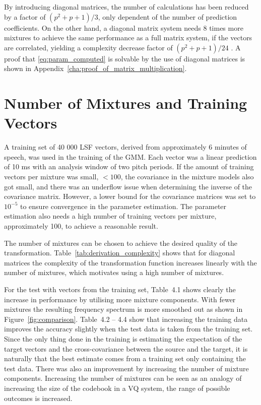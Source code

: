 By introducing diagonal matrices, the number of calculations has been reduced by a factor of $(p^2+p+1)/3$, only dependent of the number of prediction coefficients. On the other hand, a diagonal matrix system needs 8 times more mixtures to achieve the same performance as a full matrix system, if the vectors are correlated, yielding a complexity decrease factor of $(p^2+p+1)/24$ \cite{stylianou98}. A proof that \eqref{eq:param_computed} is solvable by the use of diagonal matrices is shown in Appendix~\ref{cha:proof_of_matrix_multiplication}. 


\section{Number of Mixtures and Training Vectors} %
\label{sec:number_of_mixture}
A training set of 40 000 LSF vectors, derived from approximately 6 minutes of speech, was used in the training of the GMM. Each vector was a linear prediction of 10 ms with an analysis window of two pitch periods. If the amount of training vectors per mixture was small, \eg $<100$, the covariance in the mixture models also got small, and there was an underflow issue when determining the inverse of the covariance matrix. However, a lower bound for the covariance matrices was set to $10^{-5}$ to ensure convergence in the parameter estimation. The parameter estimation also needs a high number of training vectors per mixture, approximately 100, to achieve a reasonable result.

The number of mixtures can be chosen to achieve the desired quality of the transformation. Table~\ref{tab:derivation_complexity} shows that for diagonal matrices the complexity of the transformation function increases linearly with the number of mixtures, which motivates using a high number of mixtures.

For the test with vectors from the training set, Table~4.1 shows clearly the increase in performance by utilising more mixture components. With fewer mixtures the resulting frequency spectrum is more smoothed out as shown in Figure~\ref{fig:comparison}. Table~4.2 -- 4.4 show that increasing the training data improves the accuracy slightly when the test data is taken from the training set. Since the only thing done in the training is estimating the expectation of the target vectors and the cross-covariance between the source and the target, it is naturally that the best estimate comes from a training set only containing the test data. There was also an improvement by increasing the number of mixture components. Increasing the number of mixtures can be seen as an analogy of increasing the size of the codebook in a VQ system, the range of possible outcomes is increased. 

